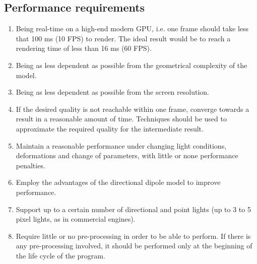 \subsection{Performance requirements}
\begin{enumerate}
\setlength{\itemsep}{-1pt}
	\item Being real-time on a high-end modern GPU, i.e. one frame should take less that 100 ms (10 FPS) to render. The ideal result would be to reach a rendering time of less than 16 ms (60 FPS).
	\item Being as less dependent as possible from the geometrical complexity of the model.
	\item Being as less dependent as possible from the screen resolution.
	\item If the desired quality is not reachable within one frame, converge towards a result in a reasonable amount of time. Techniques should be used to approximate the required quality for the intermediate result. 
	\item Maintain a reasonable performance under changing light conditions, deformations and change of parameters, with little or none performance penalties.
	\item Employ the advantages of the directional dipole model to improve performance.
	\item Support up to a certain number of directional and point lights (up to 3 to 5 pixel lights, as in commercial engines\citep{unitymanual}).
	\item Require little or no pre-processing in order to be able to perform. If there is any pre-processing involved, it should be performed only at the beginning of the life cycle of the program. 
\end{enumerate}

%

